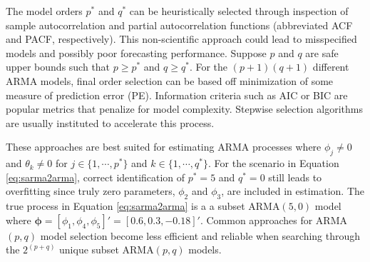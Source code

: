 The model orders $p^*$ and $q^*$ can be heuristically selected through inspection of sample autocorrelation and partial autocorrelation functions (abbreviated ACF and PACF, respectively). This non-scientific approach could lead to misspecified models and possibly poor forecasting performance. Suppose $p$ and $q$ are safe upper bounds such that $p\geq p^*$ and $q\geq q^*$. For the $(p+1)(q+1)$ different ARMA models, final order selection can be based off minimization of some measure of prediction error (PE). Information criteria such as AIC \citep{Akaike1974} or BIC \citep{Schwarz1978} are popular metrics that penalize for model complexity. Stepwise selection algorithms are usually instituted to accelerate this process.

These approaches are best suited for estimating ARMA processes where $\phi_j\neq 0$ and $\theta_k \neq 0$ for $j\in\{1,\cdots,p^*\}$ and $k\in\{1,\cdots,q^*\}$. For the scenario in Equation \ref{eq:sarma2arma}, correct identification of $p^*=5$ and $q^*=0$ still leads to overfitting since truly zero parameters, $\phi_2$ and $\phi_3$, are included in estimation. The true process in Equation \ref{eq:sarma2arma} is a a subset ARMA$(5,0)$ model where $\bm{\phi}=[\phi_1,\phi_4,\phi_5]'=[0.6,0.3,-0.18]'$. Common approaches for ARMA$(p,q)$ model selection become less efficient and reliable when searching through the $2^{(p+q)}$ unique subset ARMA$(p,q)$ models.	


